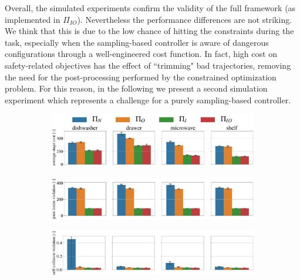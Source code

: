 Overall, the simulated experiments confirm the validity of the full framework (as implemented in $\Pi_{IO}$). Nevertheless the performance differences are not striking. We think that this is due to the low chance of hitting the constraints during the task, especially when the sampling-based controller is aware of dangerous configurations through a well-engineered cost function. In fact, high cost on safety-related objectives has the effect of ``trimming" bad trajectories, removing the need for the post-processing performed by the constrained optimization problem. For this reason, in the following we present a second simulation experiment which represents a challenge for a purely sampling-based controller. 

\begin{figure}[t]
\centering
\hspace*{-0.2cm}
\vspace*{0.15cm}
\begin{subfigure}{1\columnwidth}
    \includegraphics[width=\linewidth]{figures/methods_comparison/average_stage_cost.pdf}
\end{subfigure}%
\hfill
\hspace*{-0.2cm}
\vspace*{0.1cm}
\begin{subfigure}{\columnwidth}
    \includegraphics[width=\linewidth]{figures/methods_comparison/joint_limits.pdf}
\end{subfigure}%
\hfill
\hspace*{-0.2cm}
\vspace*{0.1cm}
\begin{subfigure}{\columnwidth}
    \includegraphics[width=\linewidth]{figures/methods_comparison/self_collision.pdf}

\end{subfigure}
\end{figure}
